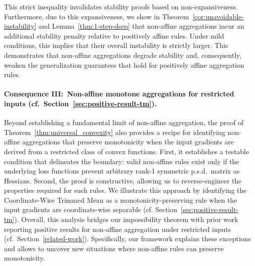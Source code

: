 \documentclass[twoside,11pt]{article}
\begin{document}
This strict inequality invalidates stability proofs based on non-expansiveness. 
Furthermore, due to this expansiveness, we show in Theorem~\ref{cor:unavoidable-instability} and Lemma~\ref{thm:1-step-dsep} that non-affine aggregations incur an additional stability penalty relative to positively affine rules. 
Under mild conditions, this implies that their overall instability is strictly larger.
This demonstrates that non-affine aggregations degrade stability and, consequently, weaken the generalization guarantees that hold for positively affine aggregation rules.

\paragraph{Consequence III:\ Non-affine monotone aggregations for restricted inputs (cf.~Section~\ref{sec:positive-result-tm}).}
Beyond establishing a fundamental limit of non-affine aggregation, the proof of Theorem~\ref{thm:universal_convexity} also provides a recipe for identifying non-affine aggregations that preserve monotonicity when the input gradients are derived from a restricted class of convex functions.
First, it establishes a testable condition that delineates the boundary: valid non-affine rules exist only if the underlying loss functions prevent arbitrary rank-1 symmetric p.s.d.\ matrix as Hessians. 
Second, the proof is constructive, allowing us to reverse-engineer the properties required for such rules. 
We illustrate this approach by identifying the Coordinate-Wise Trimmed Mean \citep[$\mathrm{CWTM}$,][]{yin2018byzantine} as a monotonicity-preserving rule when the input gradients are coordinate-wise separable (cf. Section~\ref{sec:positive-result-tm}).
Overall, this analysis bridges our impossibility theorem with prior work reporting positive results for non-affine aggregation under restricted inputs (cf.~Section~\ref{related-work}). 
Specifically, our framework explains these exceptions and allows to uncover new situations where non-affine rules can preserve monotonicity.
\end{document}
